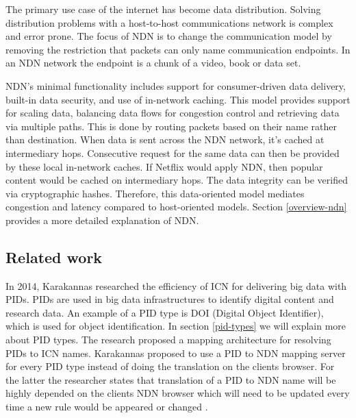 The primary use case of the internet has become data distribution. Solving distribution problems with a host-to-host communications network is complex and error prone. The focus of NDN \cite{ndn-summary} is to change the communication model by removing the restriction that packets can only name communication endpoints. In an NDN network the endpoint is a chunk of a video, book or data set.

NDN’s minimal functionality includes support for consumer-driven data delivery, built-in data security, and use of in-network caching. This model provides support for scaling data, balancing data flows for congestion control and retrieving data via multiple paths. This is done by routing packets based on their name rather than destination. When data is sent across the NDN network, it's cached at intermediary hops. Consecutive request for the same data can then be provided by these local in-network caches. If Netflix would apply NDN, then popular content would be cached on intermediary hops. The data integrity can be verified via cryptographic hashes. Therefore, this data-oriented model mediates congestion and latency compared to host-oriented models. Section \ref{overview-ndn} provides a more detailed explanation of NDN.

\subsection{Related work}
\label{introduction-related-work}

In 2014, Karakannas researched the efficiency of ICN for delivering big data with PIDs. PIDs are used in big data infrastructures to identify digital content and research data. An example of a PID type is DOI (Digital Object Identifier), which is used for object identification. In section \ref{pid-types} we will explain more about PID types. The research proposed a mapping architecture for resolving PIDs to ICN names. Karakannas proposed to use a PID to NDN mapping server for every PID type instead of doing the translation on the clients browser. For the latter the researcher states that translation of a PID to NDN name will be highly depended on the clients NDN browser which will need to be updated every time a new rule would be appeared or changed \cite{icn-bd}.

